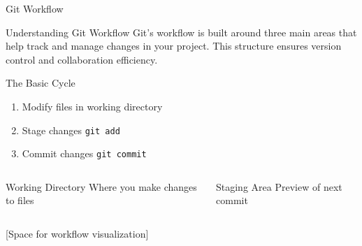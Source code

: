 \documentclass[aspectratio=169]{beamer}
\begin{document}
\begin{frame}{Git Workflow}
  \begin{block}{Understanding Git Workflow}
    Git's workflow is built around three main areas that help track and manage changes in your project. This structure ensures version control and collaboration efficiency.
  \end{block}

  \vspace{0.5em}
  \begin{block}{The Basic Cycle}
    \begin{enumerate}
      \item Modify files in working directory
      \item Stage changes \texttt{git add}
      \item Commit changes \texttt{git commit}
    \end{enumerate}
  \end{block}
  
  \begin{columns}
    \begin{column}{0.48\textwidth}
      \begin{block}{Working Directory}
        Where you make changes to files
      \end{block}
    \end{column}
    \begin{column}{0.48\textwidth}
      \begin{block}{Staging Area}
        Preview of next commit
      \end{block}
    \end{column}
  \end{columns}
  
  \vspace{1em}
  \begin{center}
    [Space for workflow visualization]
  \end{center}
\end{frame}
\end{document}

